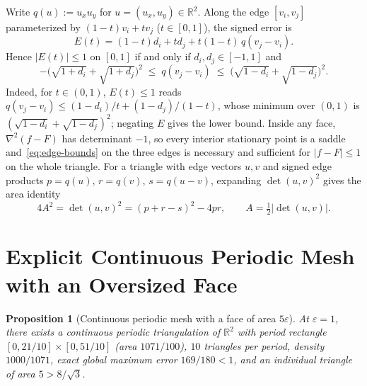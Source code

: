 \documentclass[11pt]{article}
\theoremstyle{plain}
\newtheorem{proposition}[theorem]{Proposition}
\theoremstyle{definition}
\theoremstyle{remark}
\begin{document}
Write $q(u) := u_x u_y$ for $u = (u_x, u_y) \in \mathbb{R}^2$. Along the edge $[v_i, v_j]$ parameterized by $(1-t)v_i + tv_j$ ($t \in [0,1]$), the signed error is
\[
E(t) = (1-t)d_i + t d_j + t(1-t)\,q(v_j - v_i).
\]
Hence $|E(t)| \le 1$ on $[0,1]$ if and only if $d_i, d_j \in [-1,1]$ and
\begin{equation}\label{eq:edge-bounds}
-\bigl(\sqrt{1 + d_i} + \sqrt{1 + d_j}\bigr)^2
\;\le\; q(v_j - v_i)
\;\le\; \bigl(\sqrt{1 - d_i} + \sqrt{1 - d_j}\bigr)^2.
\end{equation}
Indeed, for $t \in (0,1)$, $E(t) \le 1$ reads $q(v_j - v_i) \le (1-d_i)/t + (1-d_j)/(1-t)$, whose minimum over $(0,1)$ is $(\sqrt{1-d_i} + \sqrt{1-d_j})^2$; negating $E$ gives the lower bound.
Inside any face, $\nabla^2(f - F)$ has determinant $-1$, so every interior stationary point is a saddle and~\eqref{eq:edge-bounds} on the three edges is necessary and sufficient for $|f - F| \le 1$ on the whole triangle.
For a triangle with edge vectors $u, v$ and signed edge products $p = q(u)$, $r = q(v)$, $s = q(u-v)$, expanding $\det(u,v)^2$ gives the area identity
\begin{equation}\label{eq:area}
4A^2 = \det(u, v)^2 = (p + r - s)^2 - 4pr, \qquad A = \tfrac{1}{2}|\det(u, v)|.
\end{equation}

\section{Explicit Continuous Periodic Mesh with an Oversized Face}

\begin{proposition}[Continuous periodic mesh with a face of area $5\varepsilon$]\label{prop:oversized}
At $\varepsilon = 1$, there exists a continuous periodic triangulation of $\mathbb{R}^2$ with period rectangle $[0, 21/10] \times [0, 51/10]$ (area $1071/100$), $10$ triangles per period, density $1000/1071$, exact global maximum error $169/180 < 1$, and an individual triangle of area $5 > 8/\sqrt{3}$.
\end{proposition}
\end{document}
